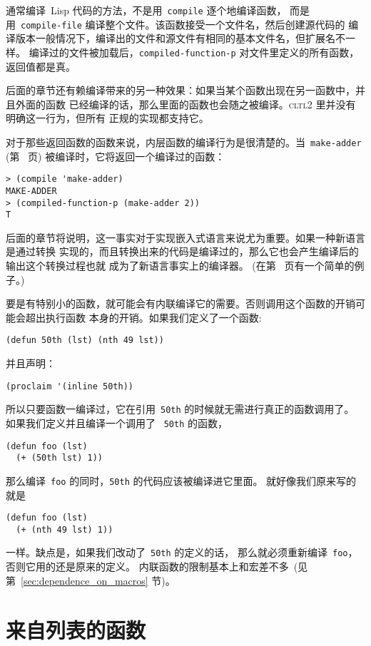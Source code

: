 通常编译~Lisp 代码的方法，不是用~\texttt{compile} 逐个地编译函数，
而是用~\texttt{compile-file} 编译整个文件。该函数接受一个文件名，然后创建源代码的
编译版本\pozhehao{}一般情况下，编译出的文件和源文件有相同的基本文件名，但扩展名不一样。
编译过的文件被加载后，\texttt{compiled-function-p} 对文件里定义的所有函数，
返回值都是真。

后面的章节还有赖编译带来的另一种效果：如果当某个函数出现在另一函数中，并且外面的函数
已经编译的话，那么里面的函数也会随之被编译。\textsc{cltl}2 里并没有明确这一行为，但所有
正规的实现都支持它。

对于那些返回函数的函数来说，内层函数的编译行为是很清楚的。当~\verb|make-adder|
(第~\pageref{fun:make-adder} 页) 被编译时，它将返回一个编译过的函数：
\begin{lstlisting}
> (compile 'make-adder)
MAKE-ADDER
> (compiled-function-p (make-adder 2))
T
\end{lstlisting}
后面的章节将说明，这一事实对于实现嵌入式语言来说尤为重要。如果一种新语言是通过转换
实现的，而且转换出来的代码是编译过的，那么它也会产生编译后的输出\pozhehao{}这个转换过程也就
成为了新语言事实上的编译器。
(在第~\pageref{page:new-language-compiler} 页有一个简单的例子。)

要是有特别小的函数，就可能会有内联编译它的需要。否则调用这个函数的开销可能会超出执行函数
本身的开销。如果我们定义了一个函数:
\begin{lstlisting}
(defun 50th (lst) (nth 49 lst))
\end{lstlisting}
并且声明：\label{page:inline_50th}
\begin{lstlisting}
(proclaim '(inline 50th))
\end{lstlisting}
所以只要函数一编译过，它在引用~\texttt{50th} 的时候就无需进行真正的函数调用了。
如果我们定义并且编译一个调用了
~\texttt{50th} 的函数，
\begin{lstlisting}
(defun foo (lst)
  (+ (50th lst) 1))
\end{lstlisting}
那么编译~\texttt{foo} 的同时，\texttt{50th} 的代码应该被编译进它里面。
就好像我们原来写的就是
\begin{lstlisting}
(defun foo (lst)
  (+ (nth 49 lst) 1))
\end{lstlisting}
一样。缺点是，如果我们改动了~\texttt{50th} 的定义的话，
那么就必须重新编译~\texttt{foo}，否则它用的还是原来的定义。
内联函数的限制基本上和宏差不多~(见第~\ref{sec:dependence_on_macros} 节)。

\section{来自列表的函数}
\label{sec:functions_from_lists}

